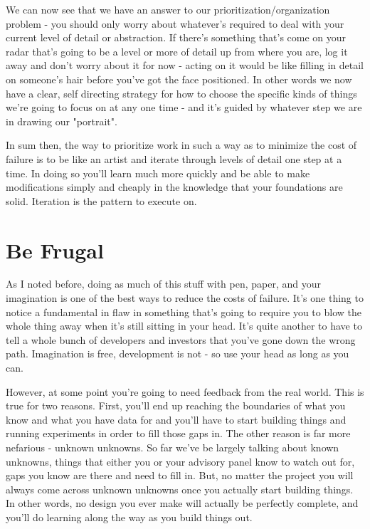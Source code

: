 \documentclass[11pt]{book}
\begin{document}
We can now see that we have an answer to our prioritization/organization problem - you should only worry about whatever's required to deal with your current level of detail or abstraction. If there's something that's come on your radar that's going to be a level or more of detail up from where you are, log it away and don't worry about it for now - acting on it would be like filling in detail on someone's hair before you've got the face positioned. In other words we now have a clear, self directing strategy for how to choose the specific kinds of things we're going to focus on at any one time - and it's guided by whatever step we are in drawing our "portrait". 
\newline

In sum then, the way to prioritize work in such a way as to minimize the cost of failure is to be like an artist and iterate through levels of detail one step at a time. In doing so you'll learn much more quickly and be able to make modifications simply and cheaply in the knowledge that your foundations are solid. Iteration is the pattern to execute on.

\section{Be Frugal}
As I noted before, doing as much of this stuff with pen, paper, and your imagination is one of the best ways to reduce the costs of failure. It's one thing to notice a fundamental in flaw in something that's going to require you to blow the whole thing away when it's still sitting in your head. It's quite another to have to tell a whole bunch of developers and investors that you've gone down the wrong path. Imagination is free, development is not - so use your head as long as you can.
\newline

However, at some point you're going to need feedback from the real world. This is true for two reasons. First, you'll end up reaching the boundaries of what you know and what you have data for and you'll have to start building things and running experiments in order to fill those gaps in. The other reason is far more nefarious - unknown unknowns. So far we've be largely talking about known unknowns, things that either you or your advisory panel know to watch out for, gaps you know are there and need to fill in. But, no matter the project you will always come across unknown unknowns once you actually start building things. In other words, no design you ever make will actually be perfectly complete, and you'll do learning along the way as you build things out. 
\newline
\end{document}
